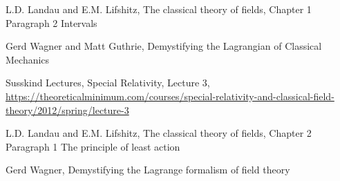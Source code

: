 \documentclass{article}
\begin{document}
\begin{thebibliography}{9}

 L.D. Landau and E.M. Lifshitz, The classical theory of fields, Chapter 1 Paragraph 2 Intervals

 Gerd Wagner and Matt Guthrie, Demystifying the Lagrangian of Classical Mechanics

 Susskind Lectures, Special Relativity, Lecture 3, \url{https://theoreticalminimum.com/courses/special-relativity-and-classical-field-theory/2012/spring/lecture-3}

 L.D. Landau and E.M. Lifshitz, The classical theory of fields, Chapter 2 Paragraph 1 The principle of least action

 Gerd Wagner, Demystifying the Lagrange formalism of field theory



\end{thebibliography}
\end{document}
